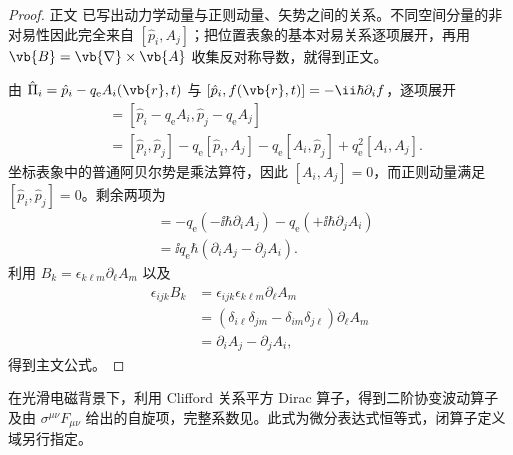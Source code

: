 \begin{proof}
正文 已写出动力学动量与正则动量、矢势之间的关系。不同空间分量的非对易性因此完全来自 $[\hat p_i,A_j]$；把位置表象的基本对易关系逐项展开，再用 $\vb{B}=\vb{\nabla}\times\vb{A}$ 收集反对称导数，就得到正文。


由 $\hat\Pi_i=\hat p_i-q_{\mathrm e} A_i(\vb{r},t)$ 与 $[\hat p_i,f(\vb{r},t)]=-\ii\hbar\partial_i f$，逐项展开
\begin{align*}
 [\hat\Pi_i,\hat\Pi_j]
 &=[\hat p_i-q_{\mathrm e} A_i,\hat p_j-q_{\mathrm e} A_j]\\
 &=[\hat p_i,\hat p_j]
 -q_{\mathrm e}[\hat p_i,A_j]
 -q_{\mathrm e}[A_i,\hat p_j]
 +q_{\mathrm e}^2[A_i,A_j].
\end{align*}
坐标表象中的普通阿贝尔势是乘法算符，因此 $[A_i,A_j]=0$，而正则动量满足 $[\hat p_i,\hat p_j]=0$。剩余两项为
\begin{align*}
 [\hat\Pi_i,\hat\Pi_j]
 &=-q_{\mathrm e}(-\ii\hbar\partial_iA_j)
 -q_{\mathrm e}(+\ii\hbar\partial_jA_i)\\
 &=\ii q_{\mathrm e}\hbar(\partial_iA_j-\partial_jA_i).
\end{align*}
利用 $B_k=\epsilon_{k\ell m}\partial_\ell A_m$ 以及
\begin{align*}
 \epsilon_{ijk}B_k
 &=\epsilon_{ijk}\epsilon_{k\ell m}\partial_\ell A_m\\
 &=(\delta_{i\ell}\delta_{jm}-\delta_{im}\delta_{j\ell})
 \partial_\ell A_m\\
 &=\partial_iA_j-\partial_jA_i,
\end{align*}
得到主文公式。
\end{proof}

\begin{proposition}
在光滑电磁背景下，利用 Clifford 关系平方 Dirac 算子，得到二阶协变波动算子及由 $\sigma^{\mu\nu}F_{\mu\nu}$ 给出的自旋项，完整系数见。此式为微分表达式恒等式，闭算子定义域另行指定。
\end{proposition}

